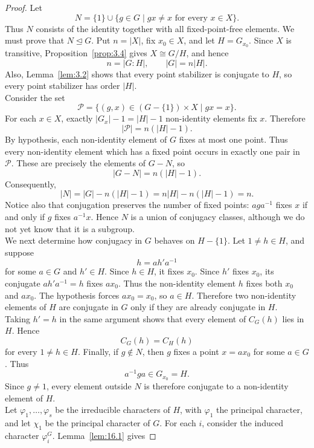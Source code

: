 \documentclass[../Odyssey_Project.tex]{subfiles}
\begin{document}
\begin{proof}
    Let
    \[
        N=\{1\}\cup\{g\in G\mid gx\neq x\text{ for every }x\in X\}.
    \]
    Thus $N$ consists of the identity together with all fixed-point-free elements. We must prove that $N\trianglelefteq G$. Put $n=|X|$, fix $x_0\in X$, and let $H=G_{x_0}$. Since $X$ is transitive, Proposition~\ref{prop:3.4} gives $X\cong G/H$, and hence
    \[
        n=|G : H|,
        \qquad
        |G|=n|H|.
    \]
    Also, Lemma~\ref{lem:3.2} shows that every point stabilizer is conjugate to $H$, so every point stabilizer has order $|H|$.\\
    Consider the set
    \[
        \mathcal{P}
        =
        \{(g,x)\in(G-\{1\})\times X\mid gx=x\}.
    \]
    For each $x\in X$, exactly $|G_x|-1=|H|-1$ non-identity elements fix $x$. Therefore
    \[
        |\mathcal{P}|=n(|H|-1).
    \]
    By hypothesis, each non-identity element of $G$ fixes at most one point. Thus every non-identity element which has a fixed point occurs in exactly one pair in $\mathcal{P}$. These are precisely the elements of $G-N$, so
    \[
        |G-N|=n(|H|-1).
    \]
    Consequently,
    \[
        |N|
        =
        |G|-n(|H|-1)
        =
        n|H|-n(|H|-1)
        =
        n.
    \]
    Notice also that conjugation preserves the number of fixed points: $aga^{-1}$ fixes $x$ if and only if $g$ fixes $a^{-1}x$. Hence $N$ is a union of conjugacy classes, although we do not yet know that it is a subgroup.\\
    We next determine how conjugacy in $G$ behaves on $H-\{1\}$. Let $1\neq h\in H$, and suppose
    \[
        h=ah'a^{-1}
    \]
    for some $a\in G$ and $h'\in H$. Since $h\in H$, it fixes $x_0$. Since $h'$ fixes $x_0$, its conjugate $ah'a^{-1}=h$ fixes $ax_0$. Thus the non-identity element $h$ fixes both $x_0$ and $ax_0$. The hypothesis forces $ax_0=x_0$, so $a\in H$. Therefore two non-identity elements of $H$ are conjugate in $G$ only if they are already conjugate in $H$.\\
    Taking $h'=h$ in the same argument shows that every element of $C_G(h)$ lies in $H$. Hence
    \[
        C_G(h)=C_H(h)
    \]
    for every $1\neq h\in H$. Finally, if $g\notin N$, then $g$ fixes a point $x=ax_0$ for some $a\in G$. Thus
    \[
        a^{-1}ga\in G_{x_0}=H.
    \]
    Since $g\neq1$, every element outside $N$ is therefore conjugate to a non-identity element of $H$.\\
    Let $\varphi_1,\ldots,\varphi_s$ be the irreducible characters of $H$, with $\varphi_1$ the principal character, and let $\chi_1$ be the principal character of $G$. For each $i$, consider the induced character $\varphi_i^G$. Lemma~\ref{lem:16.1} gives

\end{proof}
\end{document}
